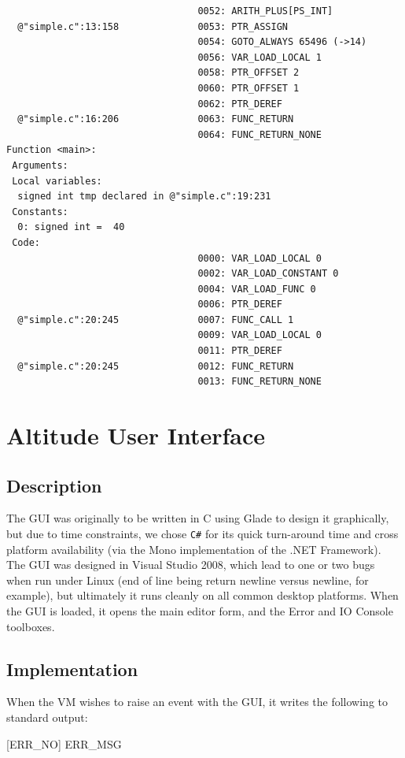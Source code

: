 \documentclass[10pt,a4paper]{report}
\begin{document}
\begin{verbatim}
                                  0052: ARITH_PLUS[PS_INT]
  @"simple.c":13:158              0053: PTR_ASSIGN
                                  0054: GOTO_ALWAYS 65496 (->14)
                                  0056: VAR_LOAD_LOCAL 1
                                  0058: PTR_OFFSET 2
                                  0060: PTR_OFFSET 1
                                  0062: PTR_DEREF
  @"simple.c":16:206              0063: FUNC_RETURN
                                  0064: FUNC_RETURN_NONE
Function <main>:
 Arguments:
 Local variables:
  signed int tmp declared in @"simple.c":19:231
 Constants:
  0: signed int =  40
 Code:
                                  0000: VAR_LOAD_LOCAL 0
                                  0002: VAR_LOAD_CONSTANT 0
                                  0004: VAR_LOAD_FUNC 0
                                  0006: PTR_DEREF
  @"simple.c":20:245              0007: FUNC_CALL 1
                                  0009: VAR_LOAD_LOCAL 0
                                  0011: PTR_DEREF
  @"simple.c":20:245              0012: FUNC_RETURN
                                  0013: FUNC_RETURN_NONE
\end{verbatim}

\section{Altitude User Interface}

\subsection{Description}
The GUI was originally to be written in C using Glade to design it graphically, but due to time constraints, we chose \lstinline{C#} for its quick turn-around time and cross platform availability (via the Mono implementation of the .NET Framework). The GUI was designed in Visual Studio 2008, which lead to one or two bugs when run under Linux (end of line being return newline versus newline, for example), but ultimately it runs cleanly on all common desktop platforms. When the GUI is loaded, it opens the main editor form, and the Error and IO Console toolboxes.

\subsection{Implementation}
When the VM wishes to raise an event with the GUI, it writes the following to standard output:

[ERR\_NO] ERR\_MSG
\end{document}
